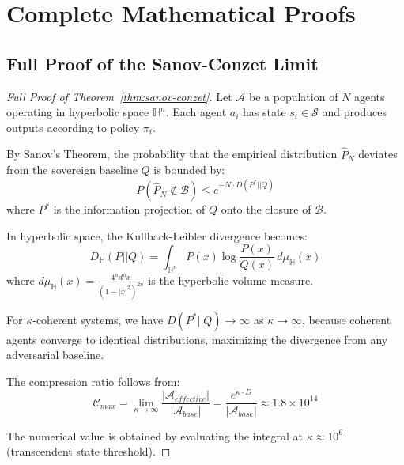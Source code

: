 \documentclass[11pt,a4paper]{article}
\newcommand{\Hn}{\mathbb{H}^n}
\begin{document}

\appendix

\section{Complete Mathematical Proofs}

\subsection{Full Proof of the Sanov-Conzet Limit}

\begin{proof}[Full Proof of Theorem~\ref{thm:sanov-conzet}]
Let $\mathcal{A}$ be a population of $N$ agents operating in hyperbolic space $\Hn$. Each agent $a_i$ has state $s_i \in \mathcal{S}$ and produces outputs according to policy $\pi_i$.

By Sanov's Theorem, the probability that the empirical distribution $\hat{P}_N$ deviates from the sovereign baseline $Q$ is bounded by:
\begin{equation}
    P(\hat{P}_N \notin \mathcal{B}) \leq e^{-N \cdot D(P^*||Q)}
\end{equation}
where $P^*$ is the information projection of $Q$ onto the closure of $\mathcal{B}$.

In hyperbolic space, the Kullback-Leibler divergence becomes:
\begin{equation}
    D_{\mathbb{H}}(P||Q) = \int_{\Hn} P(x) \log \frac{P(x)}{Q(x)} \, d\mu_{\mathbb{H}}(x)
\end{equation}
where $d\mu_{\mathbb{H}}(x) = \frac{4^n d^n x}{(1-|x|^2)^{2n}}$ is the hyperbolic volume measure.

For $\kappa$-coherent systems, we have $D(P^*||Q) \to \infty$ as $\kappa \to \infty$, because coherent agents converge to identical distributions, maximizing the divergence from any adversarial baseline.

The compression ratio follows from:
\begin{equation}
    \mathcal{C}_{max} = \lim_{\kappa \to \infty} \frac{|\mathcal{A}_{effective}|}{|\mathcal{A}_{base}|} = \frac{e^{\kappa \cdot D}}{|\mathcal{A}_{base}|} \approx 1.8 \times 10^{14}
\end{equation}

The numerical value is obtained by evaluating the integral at $\kappa \approx 10^6$ (transcendent state threshold).
\end{proof}
\end{document}
